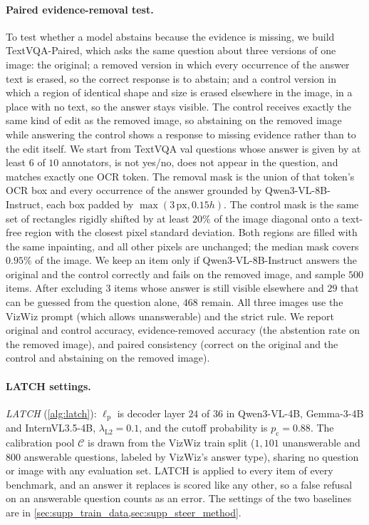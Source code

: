 \paragraph{Paired evidence-removal test.}
To test whether a model abstains because the evidence is missing, we build
TextVQA-Paired, which asks the same question about three versions of one image: the
original; a removed version in which every occurrence of the answer text
is erased, so the correct response is to abstain; and a control version in which
a region of identical shape and size is erased elsewhere in the image, in a place with
no text, so the answer stays visible. The control receives exactly the same kind of edit
as the removed image, so abstaining on the removed image while answering the control
shows a response to missing evidence rather than to the edit itself. We start from
TextVQA val questions whose answer is given by at least $6$ of $10$ annotators, is not
yes/no, does not appear in the question, and matches exactly one OCR token. The removal
mask is the union of that token's OCR box and every occurrence of the answer grounded by
Qwen3-VL-8B-Instruct, each box padded by $\max(3\,\text{px},0.15h)$. The control mask is
the same set of rectangles rigidly shifted by at least $20\%$ of the image diagonal onto
a text-free region with the closest pixel standard deviation. Both regions are filled
with the same inpainting, and all other pixels are
unchanged; the median mask covers $0.95\%$ of the image. We keep an item only if
Qwen3-VL-8B-Instruct answers the original and the control correctly and fails on the
removed image, and sample $500$ items. After excluding $3$ items whose answer is still
visible elsewhere and $29$ that can be guessed from the question alone, $468$ remain.
All three images use the VizWiz prompt (which allows unanswerable) and the strict
rule. We report original and control accuracy, evidence-removed accuracy (the abstention
rate on the removed image), and paired consistency (correct on the original and the
control and abstaining on the removed image).

\paragraph{LATCH settings.}
\emph{LATCH} (\cref{alg:latch}): $\ell_{\mathrm{p}}$ is decoder layer $24$ of $36$
in Qwen3-VL-4B, Gemma-3-4B and InternVL3.5-4B,
$\lambda_{\mathrm{L2}} = 0.1$, and the cutoff probability is $p_{\mathrm{c}} = 0.88$. The calibration pool $\mathcal{C}$ is drawn from the
VizWiz train split ($1{,}101$ unanswerable and $800$ answerable questions, labeled by
VizWiz's answer type), sharing no question or image with any evaluation set. LATCH is
applied to every item of every benchmark, and an answer it replaces is scored like any other,
so a false refusal on an answerable question counts as an error. The settings of the two
baselines are in \cref{sec:supp_train_data,sec:supp_steer_method}.
